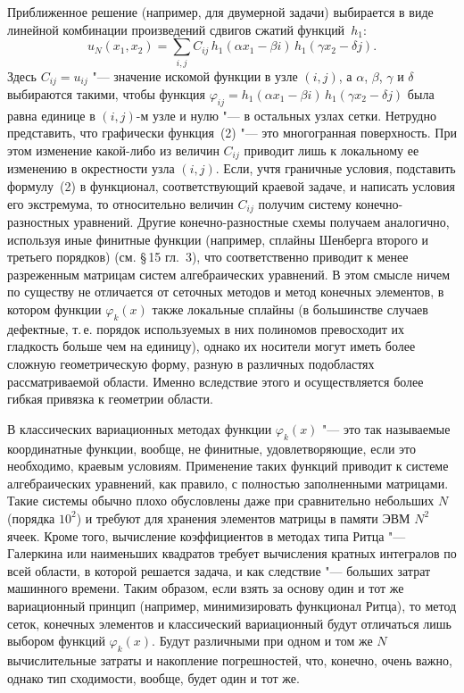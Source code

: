 Приближенное решение (например, для двумерной задачи) выбирается в виде
линейной комбинации произведений сдвигов сжатий функций~$h_1$:
\begin{equation}\tag{2}\label{eq:intro2}
u_N(x_1,x_2)=\sum_{i,j}C_{ij}\,h_1(\alpha x_1-\beta i)\,h_1(\gamma x_2-\delta j).
\end{equation}
Здесь $C_{ij}=u_{ij}$ "--- значение искомой функции в узле $(i,j)$, а
$\alpha$, $\beta$, $\gamma$ и $\delta$ выбираются такими, чтобы функция
$\varphi_{ij}=h_1(\alpha x_1-\beta i)\,h_1(\gamma x_2-\delta j)$ была равна
единице в $(i,j)$-м узле и
%
нулю "--- в остальных узлах сетки. Нетрудно представить, что графически
функция~(2) "--- это многогранная поверхность. При этом изменение
какой-либо из величин $C_{ij}$ приводит лишь к локальному ее изменению
в окрестности узла $(i,j)$. Если, учтя граничные условия, подставить
формулу~(2) в функционал, соответствующий краевой задаче, и написать условия
его экстремума, то относительно величин $C_{ij}$ получим систему
конечно-разностных уравнений. Другие конечно-разностные схемы получаем
аналогично, используя иные финитные функции (например, сплайны Шенберга
второго и третьего порядков) (см. \S\,15 гл.~3), что соответственно
приводит к менее разреженным матрицам систем алгебраических уравнений.
В этом смысле ничем по существу не отличается от сеточных методов и метод
конечных элементов, в котором функции $\varphi_k(x)$ также локальные сплайны
(в большинстве случаев дефектные, т.\,е. порядок используемых в них
полиномов превосходит их гладкость больше чем на единицу), однако их
носители могут иметь более сложную геометрическую форму, разную в различных
подобластях рассматриваемой области. Именно вследствие этого
и осуществляется более гибкая привязка к геометрии области.

В классических вариационных методах функции $\varphi_k(x)$ "--- это так
называемые координатные функции, вообще, не финитные, удовлетворяющие, если
это необходимо, краевым условиям. Применение таких функций приводит
к системе алгебраических уравнений, как правило, с полностью заполненными
матрицами. Такие системы обычно плохо обусловлены даже при сравнительно
небольших $N$ (порядка $10^2$) и требуют для хранения элементов матрицы
в памяти ЭВМ $N^2$ ячеек. Кроме того, вычисление коэффициентов в методах
типа Ритца "--- Галеркина или наименьших квадратов требует вычисления
кратных интегралов по всей области, в которой решается задача, и как
следствие "--- больших затрат машинного времени. Таким образом, если взять
за основу один и тот же вариационный принцип (например, минимизировать
функционал Ритца), то метод сеток, конечных элементов и классический
вариационный будут отличаться лишь выбором функций $\varphi_k(x)$. Будут
различными при одном и том же $N$ вычислительные затраты и накопление
погрешностей, что, конечно, очень важно, однако тип сходимости, вообще,
будет один и тот же.

